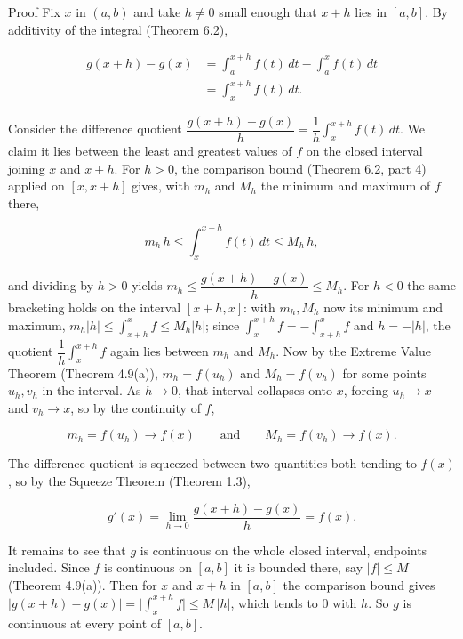 \documentclass[a4paper,12pt,oneside]{memoir}
\begin{document}
\begin{envproof}{Proof}{}{}
Fix \(x\) in \((a, b)\) and take \(h \ne 0\) small enough that \(x + h\) lies in \([a, b]\). By additivity of the integral (Theorem 6.2),

\[ \begin{aligned}
        g(x + h) - g(x) &= \int_{a}^{x+h} f(t)\,dt - \int_{a}^{x} f(t)\,dt \\[2pt]
                        &= \int_{x}^{x+h} f(t)\,dt.
      \end{aligned} \]

Consider the difference quotient \(\dfrac{g(x + h) - g(x)}{h} = \dfrac{1}{h}\displaystyle\int_{x}^{x+h} f(t)\,dt\). We claim it lies between the least and greatest values of \(f\) on the closed interval joining \(x\) and \(x + h\). For \(h > 0\), the comparison bound (Theorem 6.2, part 4) applied on \([x, x+h]\) gives, with \(m_{h}\) and \(M_{h}\) the minimum and maximum of \(f\) there,

\[ m_{h}\,h \le \int_{x}^{x+h} f(t)\,dt \le M_{h}\,h, \]

and dividing by \(h > 0\) yields \(m_{h} \le \dfrac{g(x+h) - g(x)}{h} \le M_{h}\). For \(h < 0\) the same bracketing holds on the interval \([x + h, x]\): with \(m_{h}, M_{h}\) now its minimum and maximum, \(m_{h}\lvert h\rvert \le \int_{x+h}^{x} f \le M_{h}\lvert h\rvert\); since \(\int_{x}^{x+h} f = -\int_{x+h}^{x} f\) and \(h = -\lvert h\rvert\), the quotient \(\dfrac{1}{h}\int_{x}^{x+h} f\) again lies between \(m_{h}\) and \(M_{h}\). Now by the Extreme Value Theorem (Theorem 4.9(a)), \(m_{h} = f(u_{h})\) and \(M_{h} = f(v_{h})\) for some points \(u_{h}, v_{h}\) in the interval. As \(h \to 0\), that interval collapses onto \(x\), forcing \(u_{h} \to x\) and \(v_{h} \to x\), so by the continuity of \(f\),

\[ m_{h} = f(u_{h}) \to f(x) \qquad\text{and}\qquad M_{h} = f(v_{h}) \to f(x). \]

The difference quotient is squeezed between two quantities both tending to \(f(x)\), so by the Squeeze Theorem (Theorem 1.3),

\[ g'(x) = \lim_{h \to 0} \frac{g(x + h) - g(x)}{h} = f(x). \]

It remains to see that \(g\) is continuous on the whole closed interval, endpoints included. Since \(f\) is continuous on \([a, b]\) it is bounded there, say \(\lvert f\rvert \le M\) (Theorem 4.9(a)). Then for \(x\) and \(x + h\) in \([a, b]\) the comparison bound gives \(\bigl\lvert g(x+h) - g(x)\bigr\rvert = \bigl\lvert\int_{x}^{x+h} f\bigr\rvert \le M\,\lvert h\rvert\), which tends to \(0\) with \(h\). So \(g\) is continuous at every point of \([a, b]\). \qedmark
\end{envproof}
\end{document}
